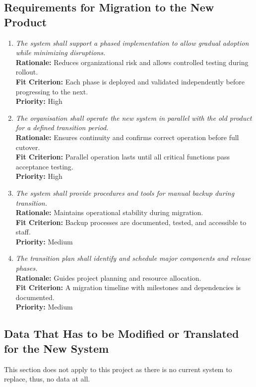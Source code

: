 \documentclass[12pt]{article}
\begin{document}
\subsection{Requirements for Migration to the New Product}
\begin{enumerate}[label=MNP-RMNP  \arabic*., wide=0pt, leftmargin=*]
  \item \emph{The system shall support a
      phased implementation to allow gradual adoption while minimizing
    disruptions.}\\
    \textbf{Rationale:} Reduces organizational risk and allows
    controlled testing during rollout.\\
    \textbf{Fit Criterion:} Each phase is deployed and validated
    independently before progressing to the next.\\
    \textbf{Priority:} High

  \item \emph{The organisation shall operate
      the new system in parallel with the old product for a defined
    transition period.}\\
    \textbf{Rationale:} Ensures continuity and confirms correct
    operation before full cutover.\\
    \textbf{Fit Criterion:} Parallel operation lasts until all
    critical functions pass acceptance testing.\\
    \textbf{Priority:} High

  \item \emph{The system shall provide
    procedures and tools for manual backup during transition.}\\
    \textbf{Rationale:} Maintains operational stability during migration.\\
    \textbf{Fit Criterion:} Backup processes are documented, tested,
    and accessible to staff.\\
    \textbf{Priority:} Medium

  \item \emph{The transition plan shall
    identify and schedule major components and release phases.}\\
    \textbf{Rationale:} Guides project planning and resource allocation.\\
    \textbf{Fit Criterion:} A migration timeline with milestones and
    dependencies is documented.\\
    \textbf{Priority:} Medium
\end{enumerate}

\subsection{Data That Has to be Modified or Translated for the New System}
This section does not apply to this project as there is no current
system to replace, thus, no data at all.
\end{document}
